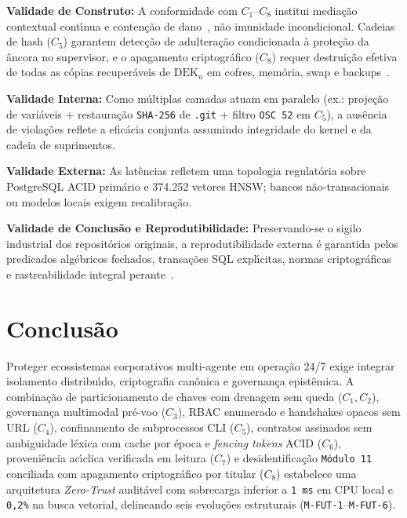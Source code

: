 \documentclass[10pt,twocolumn]{article}
\begin{document}
\textbf{Validade de Construto:} A conformidade com $C_1$--$C_8$ institui media\c{c}\~{a}o contextual cont\'{\i}nua e conten\c{c}\~{a}o de dano~\cite{R16}, n\~{a}o imunidade incondicional. Cadeias de hash ($C_5$) garantem detec\c{c}\~{a}o de adultera\c{c}\~{a}o condicionada \`{a} prote\c{c}\~{a}o da \^{a}ncora no supervisor, e o apagamento criptogr\'{a}fico ($C_8$) requer destrui\c{c}\~{a}o efetiva de todas as c\'{o}pias recuper\'{a}veis de $\mathrm{DEK}_u$ em cofres, mem\'{o}ria, swap e backups~\cite{R10}.

\textbf{Validade Interna:} Como m\'{u}ltiplas camadas atuam em paralelo (ex.: proje\c{c}\~{a}o de vari\'{a}veis + restaura\c{c}\~{a}o \texttt{SHA-256} de \texttt{.git} + filtro \texttt{OSC 52} em $C_5$), a aus\^{e}ncia de viola\c{c}\~{o}es reflete a efic\'{a}cia conjunta assumindo integridade do kernel e da cadeia de suprimentos.

\textbf{Validade Externa:} As lat\^{e}ncias refletem uma topologia regulat\'{o}ria sobre PostgreSQL ACID prim\'{a}rio e 374.252 vetores HNSW; bancos n\~{a}o-transacionais ou modelos locais exigem recalibra\c{c}\~{a}o.

\textbf{Validade de Conclus\~{a}o e Reprodutibilidade:} Preservando-se o sigilo industrial dos reposit\'{o}rios originais, a reprodutibilidade externa \'{e} garantida pelos predicados alg\'{e}bricos fechados, transa\c{c}\~{o}es SQL expl\'{\i}citas, normas criptogr\'{a}ficas~\cite{R09,R11,R17} e rastreabilidade integral perante~\cite{R01,R02,R03,R04,R05,R06,R07,R08,R09,R10,R11,R12,R13,R14,R15,R16,R17,R18,R19,R20,R21,R22,R23,R24,R25,R26,R27,R28,R29}.

\section{Conclus\~{a}o}

Proteger ecossistemas corporativos multi-agente em opera\c{c}\~{a}o 24/7 exige integrar isolamento distribu\'{\i}do, criptografia can\^{o}nica e governan\c{c}a epist\^{e}mica. A combina\c{c}\~{a}o de particionamento de chaves com drenagem sem queda ($C_1, C_2$), governan\c{c}a multimodal pr\'{e}-voo ($C_3$), RBAC enumerado e handshakes opacos sem URL ($C_4$), confinamento de subprocessos CLI ($C_5$), contratos assinados sem ambiguidade l\'{e}xica com cache por \'{e}poca e \emph{fencing tokens} ACID ($C_6$), proveni\^{e}ncia ac\'{\i}clica verificada em leitura ($C_7$) e desidentifica\c{c}\~{a}o \texttt{M\'{o}dulo 11} conciliada com apagamento criptogr\'{a}fico por titular ($C_8$) estabelece uma arquitetura \emph{Zero-Trust} audit\'{a}vel com sobrecarga inferior a \texttt{1 ms} em CPU local e \texttt{0,2\%} na busca vetorial, delineando seis evolu\c{c}\~{o}es estruturais (\texttt{M-FUT-1}--\texttt{M-FUT-6}).
\end{document}
